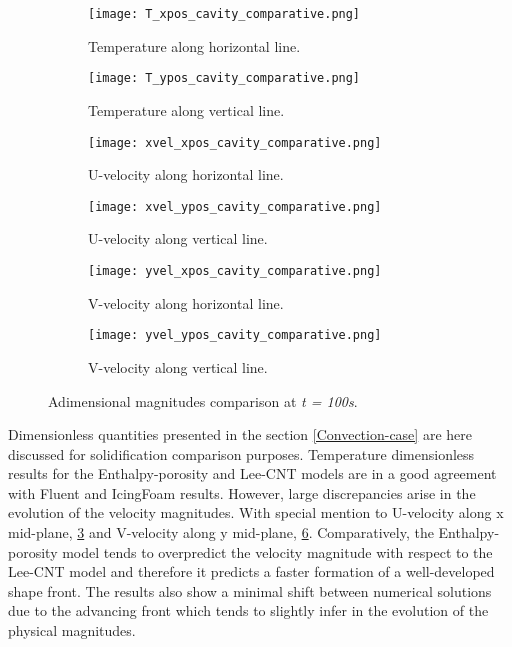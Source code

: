\begin{figure}[h!]
	\begin{subfigure}{0.50\textwidth}
		\centering
		\texttt{[image: T\_xpos\_cavity\_comparative.png]}\hfill
		\caption{Temperature along horizontal line.} \label{3.13figa}
	\end{subfigure}
	\hfill
	\begin{subfigure}{0.50\textwidth}
		\centering
		\texttt{[image: T\_ypos\_cavity\_comparative.png]}	
		\caption{Temperature along vertical line.}\label{3.13figb}
	\end{subfigure}
	\begin{subfigure}{0.50\textwidth}
		\texttt{[image: xvel\_xpos\_cavity\_comparative.png]}\hfill
		\caption{U-velocity along horizontal line.}\label{3.13figc}
	\end{subfigure}
	\begin{subfigure}{0.50\textwidth}
		\texttt{[image: xvel\_ypos\_cavity\_comparative.png]}	
		\caption{U-velocity along vertical line.}\label{3.13figd}
	\end{subfigure}
	\begin{subfigure}{0.50\textwidth}
		\texttt{[image: yvel\_xpos\_cavity\_comparative.png]}\hfill	
		\caption{V-velocity along horizontal line.}\label{3.13fige}
	\end{subfigure}
	\begin{subfigure}{0.50\textwidth}
		\texttt{[image: yvel\_ypos\_cavity\_comparative.png]}	
		\caption{V-velocity along vertical line.}\label{3.13figf}
	\end{subfigure}
	\caption{Adimensional magnitudes comparison at \textit{t = 100s}.}
	\label{3.13fig}
\end{figure}
\clearpage
\noindent Dimensionless quantities presented in the section \ref{Convection-case} are here discussed for solidification comparison purposes. Temperature dimensionless results for the Enthalpy-porosity and Lee-CNT models are in a good agreement with Fluent and IcingFoam results. However, large discrepancies arise in the evolution of the velocity magnitudes. With special mention to U-velocity along x mid-plane, \ref{3.13figc} and V-velocity along y mid-plane, \ref{3.13figf}. Comparatively, the Enthalpy-porosity model tends to overpredict the velocity magnitude with respect to the Lee-CNT model and therefore it predicts a faster formation of a well-developed shape front. The results also show a minimal shift between numerical solutions due to the advancing front which tends to slightly infer in the evolution of the physical magnitudes.

